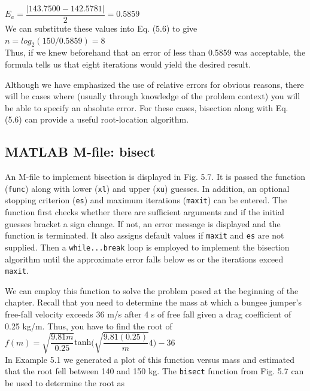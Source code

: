 \documentclass[../main.tex]{subfiles}
\begin{document}
$E_a = \dfrac{\left\lvert 143.7500 - 142.5781 \right\rvert}{2} = 0.5859$\\

\noindent We can substitute these values into Eq. (5.6) to give\\

$n = log_2(150/0.5859) = 8$\\

\noindent Thus, if we knew beforehand that an error of less than 0.5859 was acceptable, the formula
tells us that eight iterations would yield the desired result.

Although we have emphasized the use of relative errors for obvious reasons, there will
be cases where (usually through knowledge of the problem context) you will be able to
specify an absolute error. For these cases, bisection along with Eq. (5.6) can provide a useful
root-location algorithm.\\

\subsection{\textbf{MATLAB M-file}: bisect}
\noindent An M-file to implement bisection is displayed in Fig. 5.7. It is passed the function (\texttt{func})
along with lower (\texttt{xl}) and upper (\texttt{xu}) guesses. In addition, an optional stopping criterion (\texttt{es})
and maximum iterations (\texttt{maxit}) can be entered. The function first checks whether there
are sufficient arguments and if the initial guesses bracket a sign change. If not, an error
message is displayed and the function is terminated. It also assigns default values if \texttt{maxit}
and \texttt{es} are not supplied. Then a \texttt{while...break} loop is employed to implement the
bisection algorithm until the approximate error falls below es or the iterations exceed
\texttt{maxit}.

We can employ this function to solve the problem posed at the beginning of the chapter.
Recall that you need to determine the mass at which a bungee jumper's free-fall velocity
exceeds 36 m/s after 4 s of free fall given a drag coefficient of 0.25 kg/m. Thus, you have to
find the root of\\

$f(m) = \sqrt{\dfrac{9.81m}{0.25}}$tanh$\Big(\sqrt{\dfrac{9.81(0.25)}{m}}4 \Big)-36$\\

\noindent In Example 5.1 we generated a plot of this function versus mass and estimated that the root
fell between 140 and 150 kg. The \texttt{bisect} function from Fig. 5.7 can be used to determine
the root as\\
\end{document}
